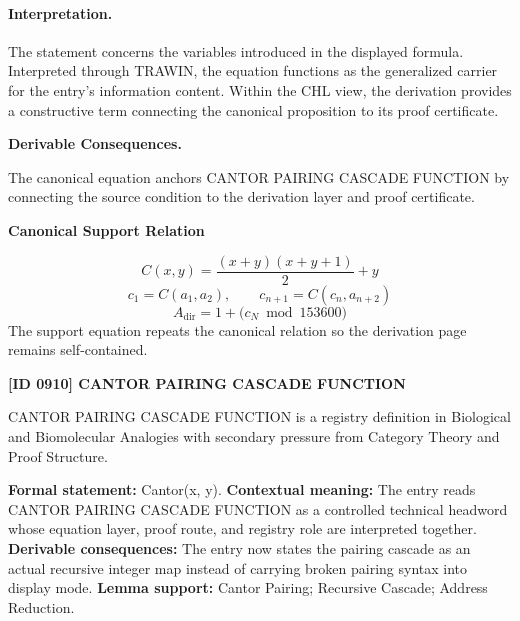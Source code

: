 \paragraph{Interpretation.}
The statement concerns the variables introduced in the displayed formula. Interpreted through TRAWIN, the equation functions as the generalized carrier for the entry’s information content. Within the CHL view, the derivation provides a constructive term connecting the canonical proposition to its proof certificate.

\par\vspace{0.35em}
\noindent\textbf{Derivable Consequences.}\quad
\begingroup
\footnotesize
\raggedright
The canonical equation anchors CANTOR PAIRING CASCADE FUNCTION by connecting the source condition to the derivation layer and proof certificate.
\par\endgroup

\noindent\textbf{Canonical Support Relation}\par
\[
C(x,y)=\frac{(x+y)(x+y+1)}{2}+y
\]
\[
c_1=C(a_1,a_2),\qquad c_{n+1}=C(c_n,a_{n+2})
\]
\[
A_{\mathrm{dir}}=1+\bigl(c_N \bmod 153600\bigr)
\]
\noindent The support equation repeats the canonical relation so the derivation page remains self-contained.\par

\clearpage
\noindent\textbf{[ID 0910] CANTOR PAIRING CASCADE FUNCTION}\par
\vspace{0.35em}
\begingroup\small
{}
CANTOR PAIRING CASCADE FUNCTION is a registry definition in Biological and Biomolecular Analogies with secondary pressure from Category Theory and Proof Structure.

\begingroup\footnotesize\setlength{\emergencystretch}{3em}\sloppy
\textbf{Formal statement:} Cantor(x, y). \textbf{Contextual meaning:} The entry reads CANTOR PAIRING CASCADE FUNCTION as a controlled technical headword whose equation layer, proof route, and registry role are interpreted together. \textbf{Derivable consequences:} The entry now states the pairing cascade as an actual recursive integer map instead of carrying broken pairing syntax into display mode. \textbf{Lemma support:} Cantor Pairing; Recursive Cascade; Address Reduction.\par
\endgroup

